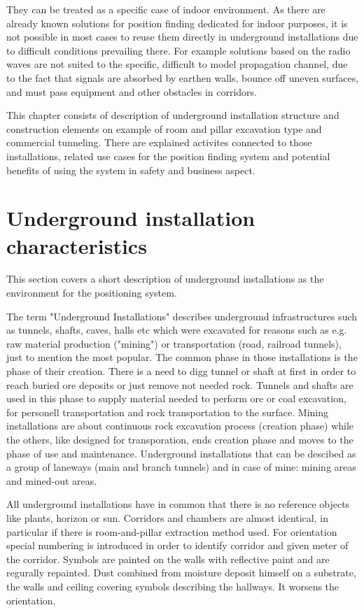 \documentclass[../main.tex]{subfiles}
\begin{document}
They can be treated as a specific case of indoor environment. As there are already known solutions for position finding dedicated for indoor purposes, it is not possible in most cases to reuse them directly in underground installations due to difficult conditions prevailing there. For example solutions based on the radio waves are not suited to the specific, difficult to model propagation channel, due to the fact that signals are absorbed by earthen walls, bounce off uneven surfaces, and must pass equipment and other obstacles in corridors.

This chapter consists of description of underground installation structure and construction elements on example of room and pillar excavation type and commercial tunneling. There are explained activites connected to those installations, related use cases for the position finding system and potential benefits of using the system in safety and business aspect.

\section{Underground installation characteristics}

This section covers a short description of underground installations as the environment for the positioning system.

The term "Underground Installations" describes underground infrastructures such as tunnels, shafts, caves, halls etc which were excavated for reasons such as e.g. raw material production ("mining") or transportation (road, railroad tunnels), just to mention the most popular. The common phase in those installations is the phase of their creation. There is a need to digg tunnel or shaft at first in order to reach buried ore deposits or just remove not needed rock. Tunnels and shafts are used in this phase to supply material needed to perform ore or coal excavation, for personell transportation and rock transportation to the surface. Mining installations are about continuous rock excavation process (creation phase) while the others, like designed for transporation, ends creation phase and moves to the phase of use and maintenance. Underground installations that can be descibed as a group of laneways (main and branch tunnels) and in case of mine: mining areas and mined-out areas.

All underground installations have in common that there is no reference objects like plants, horizon or sun. Corridors and chambers are almost identical, in particular if there is room-and-pillar extraction method used. For orientation special numbering is introduced in order to identify corridor and given meter of the corridor. Symbols are painted on the walls with reflective paint and are regurally repainted. Dust combined from moisture deposit himself on a substrate, the walls and ceiling covering symbols describing the hallways. It worsens the orientation.
\end{document}
